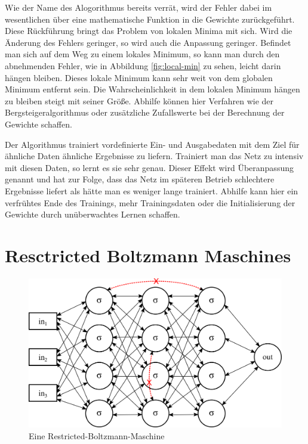 Wie der Name des Alogorithmus bereits verrät, wird der Fehler dabei im wesentlichen über eine mathematische Funktion in die Gewichte zurückgeführt. Diese Rückführung bringt das Problem von lokalen Minima mit sich. Wird die Änderung des Fehlers geringer, so wird auch die Anpassung geringer. Befindet man sich auf dem Weg zu einem lokales Minimum, so kann man durch den abnehmenden Fehler, wie in Abbildung \ref{fig:local-min} zu sehen, leicht darin hängen bleiben. Dieses lokale Minimum kann sehr weit von dem globalen Minimum entfernt sein. Die Wahrscheinlichkeit in dem lokalen Minimum hängen zu bleiben steigt mit seiner Größe. Abhilfe können hier Verfahren wie der Bergsteigeralgorithmus oder zusätzliche Zufallswerte bei der Berechnung der Gewichte schaffen.

Der Algorithmus trainiert vordefinierte Ein- und Ausgabedaten mit dem Ziel für ähnliche Daten ähnliche Ergebnisse zu liefern. Trainiert man das Netz zu intensiv mit diesen Daten, so lernt es sie sehr genau. Dieser Effekt wird Überanpassung genannt und hat zur Folge, dass das Netz im späteren Betrieb schlechtere Ergebnisse liefert als hätte man es weniger lange trainiert. Abhilfe kann hier ein verfrühtes Ende des Trainings, mehr Trainingsdaten oder die Initialisierung der Gewichte durch unüberwachtes Lernen schaffen.

\section{Resctricted Boltzmann Maschines}

\begin{figure}
	\centering
	\includegraphics[scale=1]{images/rbm.png}
	\caption{Eine Restricted-Boltzmann-Maschine}
	\label{fig:rbm}
\end{figure}

